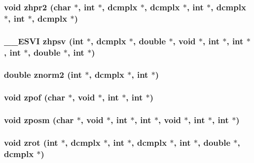 \subsubsection{\setlength{\rightskip}{0pt plus 5cm}void zhpr2 (char $\ast$, int $\ast$, {\bf dcmplx} $\ast$, {\bf dcmplx} $\ast$, int $\ast$, {\bf dcmplx} $\ast$, int $\ast$, {\bf dcmplx} $\ast$)}\label{essl_8h_6a791e23ff9cf3850fca0ae3c36f7155}


\subsubsection{\setlength{\rightskip}{0pt plus 5cm}\_\-\_\-ESVI zhpsv (int $\ast$, {\bf dcmplx} $\ast$, double $\ast$, void $\ast$, int $\ast$, int $\ast$, int $\ast$, double $\ast$, int $\ast$)}\label{essl_8h_243c33bf9cf8179d16284fe7747b5c27}


\subsubsection{\setlength{\rightskip}{0pt plus 5cm}double znorm2 (int $\ast$, {\bf dcmplx} $\ast$, int $\ast$)}\label{essl_8h_754813139b1fcdfc5aca9a85e9508b03}


\subsubsection{\setlength{\rightskip}{0pt plus 5cm}void zpof (char $\ast$, void $\ast$, int $\ast$, int $\ast$)}\label{essl_8h_0124ed07de676261d526e0868e202446}


\subsubsection{\setlength{\rightskip}{0pt plus 5cm}void zposm (char $\ast$, void $\ast$, int $\ast$, int $\ast$, void $\ast$, int $\ast$, int $\ast$)}\label{essl_8h_e7fad7f343f6fd0f6c42a67cb28eccd6}


\subsubsection{\setlength{\rightskip}{0pt plus 5cm}void zrot (int $\ast$, {\bf dcmplx} $\ast$, int $\ast$, {\bf dcmplx} $\ast$, int $\ast$, double $\ast$, {\bf dcmplx} $\ast$)}\label{essl_8h_46f79634a135503a1561e8a0bdc536fa}


